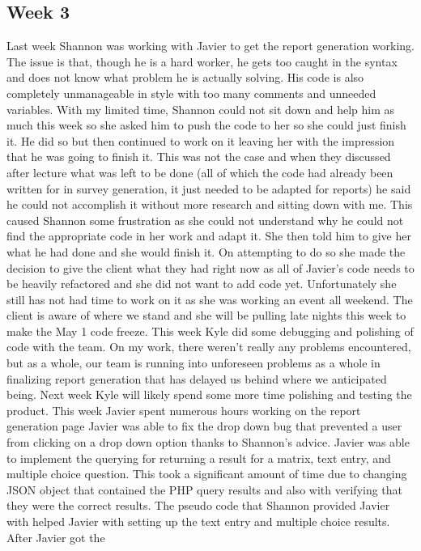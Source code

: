 \documentclass[letterpaper,10pt,serif,draftclsnofoot,onecolumn,compsoc,titlepage]{IEEEtran}
\begin{document}
\subsection{Week 3}
Last week Shannon was working with Javier to get the report generation working. The issue is that,
 though he is a hard worker, he gets too caught in the syntax and does not know what problem he is
 actually solving. His code is also completely unmanageable in style with too many comments and
 unneeded variables. With my limited time, Shannon could not sit down and help him as much this week
 so she asked him to push the code to her so she could just finish it. He did so but then continued to
 work on it leaving her with the impression that he was going to finish it. This was not the case and 
 when they discussed after lecture what was left to be done (all of which the code had already been 
 written for in survey generation, it just needed to be adapted for reports) he said he could not 
 accomplish it without more research and sitting down with me. This caused Shannon some frustration as
 she could not understand why he could not find the appropriate code in her work and adapt it. She then
 told him to give her what he had done and she would finish it. On attempting to do so she made the
 decision to give the client what they had right now as all of Javier's code needs to be heavily refactored
 and she did not want to add code yet. Unfortunately she still has not had time to work on it as she was working
 an event all weekend. The client is aware of where we stand and she will be pulling late nights this week
 to make the May 1 code freeze.
 This week Kyle did some debugging and polishing of code with the team. On my work, there weren't really
 any problems encountered, but as a whole, our team is running into unforeseen problems as a whole in 
 finalizing report generation that has delayed us behind where we anticipated being.
Next week Kyle will likely spend some more time polishing and testing the product.
This week Javier spent numerous hours working on the report generation page Javier was able to fix
 the drop down bug that prevented a user from clicking on a drop down option thanks to Shannon's advice.
 Javier was able to implement the querying for returning a result for a matrix, text entry, and multiple
 choice question. This took a significant amount of time due to changing JSON object that contained the
 PHP query results and also with verifying that they were the correct results. The pseudo code that Shannon
 provided Javier with helped Javier with setting up the text entry and multiple choice results. After Javier got the
\end{document}
